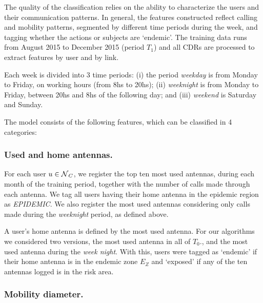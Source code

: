 The quality of the classification relies on the ability to characterize the users and their communication patterns. %
In general, the features constructed reflect calling and mobility patterns,
segmented by different time periods during the week, and tagging whether the actions or subjects are `endemic'. 
The training data runs from August 2015 to December 2015 (period $T_1$) and all CDRs are processed to extract features by user and by link. 

Each week is divided into 3 time periods: (i) the period \textit{weekday} is from Monday to Friday, on working hours (from 8hs to 20hs); (ii) \textit{weeknight} is from Monday to Friday, between 20hs and 8hs of the following day;
and (iii) \textit{weekend} is Saturday and Sunday.

The model consists of the following features, which can be classified in 4 categories:


\subsubsection{Used and home antennas.}\label{homeantenna}

For each user $u \in \operatorname{\mathcal{N}}_C$, we register the top ten most used antennas, during each month of the training period,
together with the number of calls made through each antenna. We tag all users having their home antenna in the epidemic region as \textit{EPIDEMIC}. 
%
%
We also register the most used antennas considering only calls made during the \textit{weeknight} period, as defined above. %

A user's home antenna is defined by the most used antenna. For our algorithms we considered two versions, the most used antenna in all of $T_0$., and the most used antenna during the \textit{week night}.
With this, users were tagged as `endemic' if their home antenna is in the endemic zone $E_Z$ and `exposed' if any of the ten antennas logged is in the risk area.


\subsubsection{Mobility diameter.}


